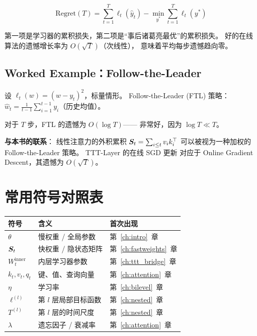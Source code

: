 \begin{equation}
  \text{Regret}(T) = \sum_{t=1}^T \ell_t(\hat{y}_t)
  - \min_{y^*} \sum_{t=1}^T \ell_t(y^*)
  \label{eq:regret}
\end{equation}

第一项是学习器的累积损失，第二项是``事后诸葛亮最优''的累积损失。
好的在线算法的遗憾增长率为 $O(\sqrt{T})$（次线性），
意味着平均每步遗憾趋向零。

\subsection{Worked Example：Follow-the-Leader}

设 $\ell_t(w) = (w - y_t)^2$，标量情形。
Follow-the-Leader (FTL) 策略：$\hat{w}_t = \frac{1}{t-1}\sum_{i=1}^{t-1} y_i$（历史均值）。

对于 $T$ 步，FTL 的遗憾为 $O(\log T)$——
非常好，因为 $\log T \ll T$。

\textbf{与本书的联系}：
线性注意力的外积累积 $\boldsymbol{S}_t = \sum_{i \leq t} v_i k_i^\top$
可以被视为一种加权的 Follow-the-Leader 策略。
TTT-Layer 的在线 SGD 更新
对应于 Online Gradient Descent，其遗憾为 $O(\sqrt{T})$。

\section{常用符号对照表}
\label{sec:app_notation}

\begin{center}
\begin{tabular}{lll}
\toprule
\textbf{符号} & \textbf{含义} & \textbf{首次出现} \\
\midrule
$\theta$ & 慢权重 / 全局参数 & 第~\ref{ch:intro}~章 \\
$\boldsymbol{S}_t$ & 快权重 / 隐状态矩阵 & 第~\ref{ch:fastweights}~章 \\
$W_t^{\text{inner}}$ & 内层学习器参数 & 第~\ref{ch:ttt_bridge}~章 \\
$k_t, v_t, q_t$ & 键、值、查询向量 & 第~\ref{ch:attention}~章 \\
$\eta$ & 学习率 & 第~\ref{ch:bilevel}~章 \\
$\ell^{(l)}$ & 第 $l$ 层局部目标函数 & 第~\ref{ch:nested}~章 \\
$T^{(l)}$ & 第 $l$ 层的时间尺度 & 第~\ref{ch:nested}~章 \\
$\lambda$ & 遗忘因子 / 衰减率 & 第~\ref{ch:attention}~章 \\
\bottomrule
\end{tabular}
\end{center}
